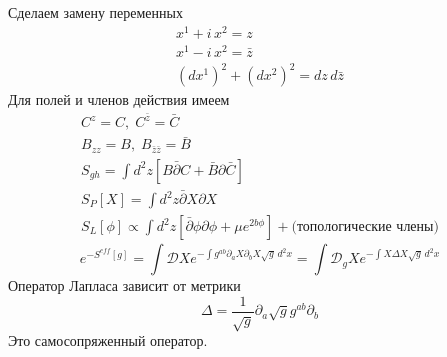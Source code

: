 \documentclass[a4paper,12pt]{article}
\theoremstyle{definition} \newtheorem{Def}{Definition}
\begin{document}
Сделаем замену переменных
\begin{equation}
  \label{eq:32}
  \begin{split}
    x^1+i\, x^2=z\\
    x^1-i\, x^2=\bar{z}\\
    (dx^1)^2+(dx^2)^2=dz\,d\bar{z}
  \end{split}
\end{equation}
Для полей и членов действия имеем
\begin{equation}
  \label{eq:33}
  \begin{split}
    C^z=C,\; C^{\bar{z}}=\bar{C}\\
    B_{zz}=B, \; B_{\bar{z}\bar{z}}=\bar{B}\\
    S_{gh}=\int d^2z [B\bar{\partial}C+\bar{B}\partial \bar{C}]\\
    S_P[X]=\int d^2z \bar{\partial}X \partial X\\
    S_L[\phi] \propto \int d^2z \left[\bar{\partial} \phi \partial \phi+\mu e^{2 b \phi}\right] + \mbox{(топологические члены)}
  \end{split}
\end{equation}
\begin{equation}
  \label{eq:34}
  e^{-S^{eff}[g]}=\int \mathcal{D} X e^{-\int g^{ab}\partial_a X \partial_b X \sqrt{g}\, d^2x} = \int \mathcal{D}_g X e^{-\int X \Delta X\sqrt{g}\, d^2x}
\end{equation}
Оператор Лапласа зависит от метрики
\begin{equation}
  \label{eq:35}
  \Delta = \frac{1}{\sqrt{g}}\partial_a \sqrt{g} g^{ab}\partial_b
\end{equation}
Это самосопряженный оператор.
\end{document}
